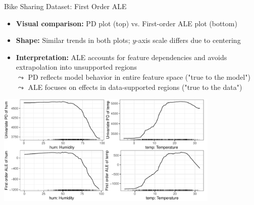 \documentclass[10pt,compress,t,notes=noshow, xcolor=table]{beamer}
\begin{document}
\begin{frame}{Bike Sharing Dataset: First Order ALE}

\begin{itemize}
  \item \textbf{Visual comparison:} PD plot (top) vs. First-order ALE plot (bottom)
  \item \textbf{Shape:} Similar trends in both plots; $y$-axis scale differs due to centering
  \item \textbf{Interpretation:} ALE accounts for feature dependencies and avoids extrapolation into unsupported regions
  \\$\leadsto$ PD reflects model behavior in entire feature space ("true to the model")\\
  $\leadsto$ ALE focuses on effects in data-supported regions ("true to the data")
\end{itemize}

\begin{center}
\includegraphics[width=0.8\textwidth]{figure/ale1d}
\end{center}


\end{frame}

\end{document}
